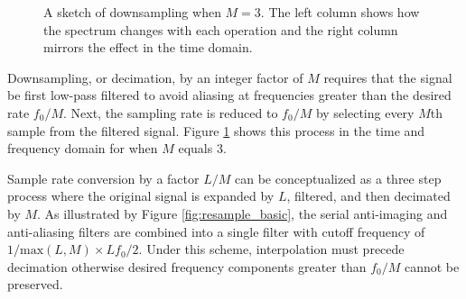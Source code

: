 \begin{figure}[t!]
\caption{A sketch of downsampling when $M = 3$. The left column shows how the spectrum changes with each operation
and the right column mirrors the effect in the time domain.}
\label{fig:downsampling}
\end{figure}

Downsampling, or decimation, by an integer factor of $M$ requires that the signal be first low-pass filtered to 
avoid aliasing at frequencies greater than the desired rate $f_0/M$.  Next, the sampling rate is reduced to 
$f_0/M$ by selecting every $M$th sample from the filtered signal.  Figure \ref{fig:downsampling} shows this 
process in the time and frequency domain for when $M$ equals 3.

Sample rate conversion by a factor $L/M$ can be conceptualized as a three step process where the original signal 
is expanded by $L$, filtered, and then decimated by $M$.  As illustrated by Figure \ref{fig:resample_basic}, 
the serial anti-imaging and 
anti-aliasing filters are combined into a single filter with cutoff frequency of 
$1/\mathrm{max}(L,M) \times Lf_0/2$.  Under this scheme, interpolation must precede decimation otherwise desired 
frequency components greater than $f_0/M$ cannot be preserved.


